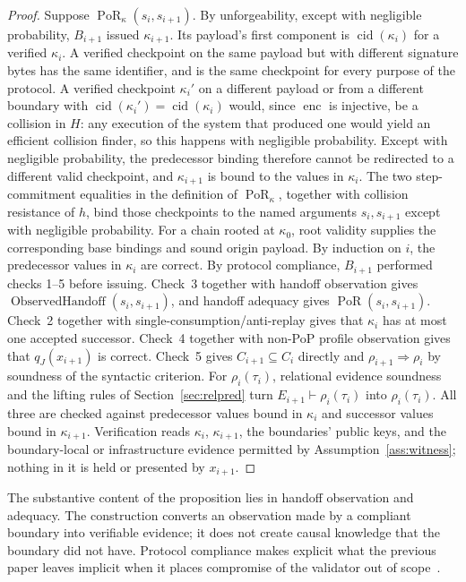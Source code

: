 \documentclass[10pt,twocolumn]{article}
\newcommand{\PoR}{\operatorname{PoR}}
\begin{document}
\begin{proof}
Suppose \(\PoR_\kappa(s_i,s_{i+1})\). By unforgeability, except with
negligible probability, \(B_{i+1}\) issued \(\kappa_{i+1}\). Its payload's first
component is \(\operatorname{cid}(\kappa_i)\) for a verified \(\kappa_i\). A
verified checkpoint on the same payload but with different signature bytes has
the same identifier, and is the same checkpoint for every purpose of the
protocol. A verified checkpoint \(\kappa_i'\) on a different payload or from a
different boundary with \(\operatorname{cid}(\kappa_i')=\operatorname{cid}(\kappa_i)\)
would, since \(\operatorname{enc}\) is injective, be a collision in \(H\): any
execution of the system that produced one would yield an efficient collision
finder, so this happens with negligible probability. Except with
negligible probability, the predecessor binding therefore cannot be redirected
to a different valid checkpoint, and \(\kappa_{i+1}\) is bound to the values in
\(\kappa_i\). The two step-commitment equalities in the definition of
\(\PoR_\kappa\), together with collision resistance of \(h\), bind those
checkpoints to the named arguments \(s_i,s_{i+1}\) except with negligible
probability. For a chain rooted at \(\kappa_0\), root validity supplies the
corresponding base bindings and sound origin payload. By induction on \(i\), the
predecessor values in \(\kappa_i\) are correct. By protocol compliance,
\(B_{i+1}\) performed checks 1--5 before
issuing. Check~3 together with handoff observation gives
\(\operatorname{ObservedHandoff}(s_i,s_{i+1})\), and handoff adequacy gives
\(\PoR(s_i,s_{i+1})\). Check~2 together with
single-consumption/anti-replay gives that \(\kappa_i\) has at most one accepted
successor. Check~4 together with
non-PoP profile observation gives that \(q_J(x_{i+1})\) is correct. Check~5
gives \(C_{i+1}\subseteq C_i\) directly and \(\rho_{i+1}\Rightarrow\rho_i\) by
soundness of the syntactic criterion. For \(\rho_i(\tau_i)\), relational
evidence soundness and the lifting rules of Section~\ref{sec:relpred} turn
\(E_{i+1}\vdash\rho_i(\tau_i)\) into \(\rho_i(\tau_i)\). All three
are checked against predecessor values bound in \(\kappa_i\) and successor
values bound in \(\kappa_{i+1}\). Verification
reads \(\kappa_i\), \(\kappa_{i+1}\), the boundaries' public keys, and the
boundary-local or infrastructure evidence permitted by
Assumption~\ref{ass:witness}; nothing in it is held or presented by
\(x_{i+1}\).
\end{proof}

The substantive content of the proposition lies in handoff observation and
adequacy. The
construction converts an observation made by a compliant boundary into
verifiable evidence; it does not create causal knowledge that the boundary did
not have. Protocol compliance makes explicit what the previous paper leaves
implicit when it places compromise of the validator out of
scope~\cite{gallo2026poc}.
\end{document}
